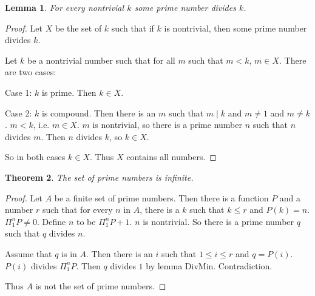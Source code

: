 \documentclass[a4paper,10pt]{article}
\theoremstyle{plain}
\newtheorem{theorem}{Theorem}
\newtheorem{lemma}[theorem]{Lemma}
\theoremstyle{definition}
\begin{document}
\begin{lemma} 
For every nontrivial $k$ some prime number divides $k$.
\end{lemma}
\begin{proof}
Let $X$ be the set of $k$ such that if $k$ is nontrivial, then some prime number divides $k$.

Let $k$ be a nontrivial number such that for all $m$ such that $m < k$, $m \in X$. There are two cases:

Case 1: $k$ is prime. 
Then $k \in X$.

Case 2: $k$ is compound. 
Then there is an $m$ such that $m \mid k$ and $m \neq 1$ and $m \neq k$.
$m < k$, i.e. $m \in X$. $m$ is nontrivial, so there is a prime number $n$ such that $n$ divides $m$.
Then $n$ divides $k$, so $k \in X$.

So in both cases $k \in X$. Thus $X$ contains all numbers.
\end{proof}

\begin{theorem}
The set of prime numbers is infinite.
\end{theorem}
\begin{proof}
Let $A$ be a finite set of prime numbers.
Then there is a function $P$ and a number $r$ such that for every $n$ in $A$, there is a $k$ such that $k \leq r$ and $P(k) = n$. 
$\Pi_1^n P \neq 0$.
Define $n$ to be $\Pi_1^n P +1$.
$n$ is nontrivial. So there is a prime number $q$ such that $q$ divides $n$.

Assume that $q$ is in $A$. Then there is an $i$ such that $1 \leq i \leq r$ and $q=P(i)$. $P(i)$ divides $\Pi_1^n P$. Then $q$ divides $1$ by lemma DivMin. Contradiction. 

Thus $A$ is not the set of prime numbers.
\end{proof}
\end{document}
